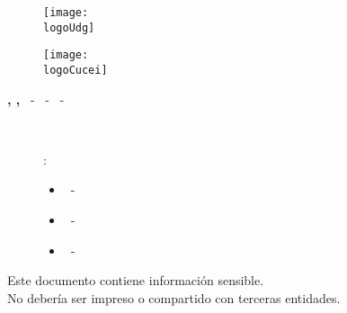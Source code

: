 



\begin{titlepage}
	\onecolumn %
	\centering
	{\huge\textbf{\universidad}}\par\vspace{0.6cm}
	{\LARGE{\cede}}\vfill

	\begin{figure}[h]
		\begin{minipage}[t]{0.45\textwidth}
			\centering
			\texttt{[image: \\logoUdg]}
		\end{minipage}
		\hfill
		\begin{minipage}[t]{0.45\textwidth}
			\centering
			\texttt{[image: \\logoCucei]}
		\end{minipage}
	\end{figure}\vfill

	\Large{
		\division\vfill
		\textbf{\theAuthorTitle, \bAuthorTitle, \cAuthorTitle}\vfill
		\textbf{\materia}\vfill
		\seccion\ - \clave\ - \nrc\ - \generation
	}
	\vfill

	{\LARGE{\textbf{\theTitle \\}}}
	\vfill

	\begin{figure}[H]
		\centering
		\begin{minipage}[t]{0.62\textwidth}
			{\Large
				\begin{center}
					\textbf{\teamName}:\par\vspace{8pt}
				\end{center}
				\begin{itemize}
					\item \theAuthor\ - \theAuthorCode
					\item \bAuthor\ - \bAuthorCode
					\item \cAuthor\ - \cAuthorCode
				\end{itemize}
			}
		\end{minipage}
	\end{figure}
	\vfill

	\begin{tcolorbox}[colback=red!5!white, colframe=red!75!black]
		\centering
		Este documento contiene información sensible.\\
		No debería ser impreso o compartido con terceras entidades.
	\end{tcolorbox}\vfill

	{\large \startDate}\par
\end{titlepage}

